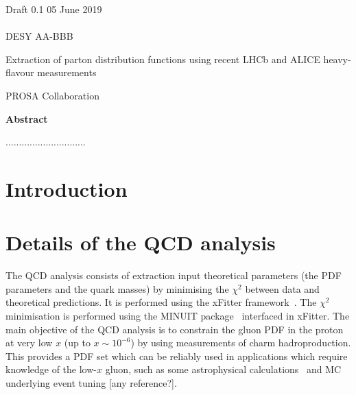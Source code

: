 \documentclass[12pt]{article}
\begin{document}
\begin{titlepage}
\noindent
Draft 0.1  \hfill 05 June 2019\\
\\
DESY AA-BBB %
\\

\vspace{1.3cm}

\begin{center}
  {\bf 

\large

Extraction of parton distribution functions using recent LHCb and ALICE heavy-flavour measurements
  }
  \vspace{1.5cm}

  {\large
    PROSA Collaboration
  }\\

  \vspace{1.2cm}

\end{center}
  \vspace{2.4cm}
\begin{center}
\large
{\bf Abstract}
\vspace{-0.2cm}
\end{center}
..............................
\vfill
\end{titlepage}


%
%
\newpage

\section{Introduction}
\label{sect:intro}

\section{Details of the QCD analysis}
\label{sec:qcdanalysis}
The QCD analysis consists of extraction input theoretical parameters (the PDF parameters and the quark masses) by minimising the $\chi^2$ between  data and theoretical predictions. 
It is performed using the xFitter framework~\cite{Alekhin:2014irh}. 
The $\chi^2$ minimisation is performed using the MINUIT package~\cite{James:1975dr} interfaced in xFitter.
The main objective of the QCD analysis is to constrain the gluon PDF in the proton at very low $x$ (up to $x \sim 10^{-6}$) by using measurements of charm hadroproduction. This provides a PDF set which can be reliably used in applications which require knowledge of the low-$x$ gluon, such as some astrophysical calculations~\cite{Garzelli:2015psa,Gauld:2015yia,Gauld:2015kvh,Garzelli:2016xmx,Bertone:2018dse} and MC underlying event tuning [any reference?].
\end{document}
